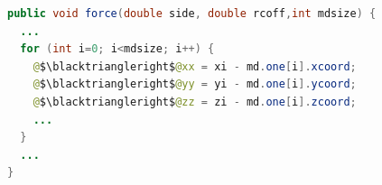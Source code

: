 \documentclass[sigconf,10pt,review,anonymous]{acmart}\settopmatter{printfolios=true,printccs=false,printacmref=false}
\begin{document}
\begin{figure}
\begin{lstlisting}[firstnumber=1,language=java]
public void force(double side, double rcoff,int mdsize) {
  ...
  for (int i=0; i<mdsize; i++) {
    @$\blacktriangleright$@xx = xi - md.one[i].xcoord;
    @$\blacktriangleright$@yy = yi - md.one[i].ycoord;
    @$\blacktriangleright$@zz = zi - md.one[i].zcoord;
    ...
  }
  ...
}
\end{lstlisting}
\vspace{-0.3in}
\label{JGFMolDynBench}
\end{figure}




%
%
%
%


%
\end{document}
